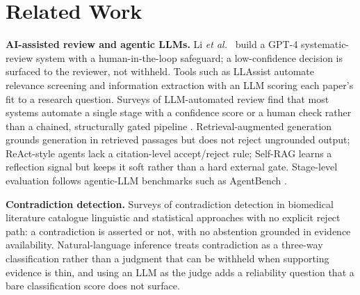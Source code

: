 \documentclass[conference]{IEEEtran}
\begin{document}
\section{Related Work}
\textbf{AI-assisted review and agentic LLMs.} Li \emph{et al.}\
\cite{li2025enhancing} build a GPT-4 systematic-review system with a
human-in-the-loop safeguard; a low-confidence decision is surfaced to the
reviewer, not withheld. Tools such as LLAssist \cite{haryanto2024llassist} automate relevance screening
and information extraction with an LLM scoring each paper's fit to a research
question. Surveys of LLM-automated review find that most systems automate a
single stage with a confidence score or a human check rather than a chained,
structurally gated pipeline
\cite{scherbakov2025emergence,vandinter2021automation}. Retrieval-augmented
generation \cite{lewis2020retrieval} grounds generation in retrieved passages
but does not reject ungrounded output; ReAct-style agents \cite{yao2023react}
lack a citation-level accept/reject rule; Self-RAG \cite{asai2024selfrag} learns
a reflection signal but keeps it soft rather than a hard external gate.
Stage-level evaluation follows agentic-LLM benchmarks such as AgentBench
\cite{liu2024agentbench}.

\textbf{Contradiction detection.} Surveys of contradiction detection in
biomedical literature \cite{alamri2016contradiction} catalogue linguistic and
statistical approaches with no explicit reject path: a contradiction is asserted
or not, with no abstention grounded in evidence availability. Natural-language
inference \cite{williams2018broad} treats contradiction as a three-way
classification rather than a judgment that can be withheld when supporting
evidence is thin, and using an LLM as the judge adds a reliability question
\cite{zheng2023judging} that a bare classification score does not surface.
\end{document}
